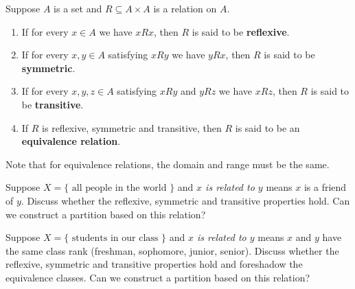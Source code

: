 \begin{dfn}
Suppose $A$ is a set and $R \subseteq A \times A$ is a relation on $A$.
\begin{enumerate}
\item If for every $x \in A$ we have $xRx$, then $R$ is said to be \textbf{reflexive}.
\item If for every $x,y \in A$ satisfying $xRy$ we have $yRx$, then $R$ is said to be \textbf{symmetric}.
\item If for every $x,y,z \in A$ satisfying $xRy$ and $yRz$ we have $xRz$, then $R$ is said to be \textbf{transitive}.
\item If $R$ is reflexive, symmetric and transitive, then $R$ is said to be an \textbf{equivalence relation}.
\end{enumerate}
\end{dfn}

Note that for equivalence relations, the domain and range must be the same.

\begin{expl}
Suppose $X = \{\mbox{ all people in the world }\}$ and \emph{$x$ is related to $y$} means $x$ is a friend of $y$.
Discuss whether the reflexive, symmetric and transitive properties hold.  Can we construct a partition based on this relation?
\end{expl}

\begin{expl}
Suppose $X = \{\mbox{ students in our class }\}$ and \emph{$x$ is related to $y$} means $x$ and $y$ have the same class rank (freshman, sophomore, junior, senior). Discuss whether the reflexive, symmetric and transitive properties hold and foreshadow the equivalence classes.  Can we construct a partition based on this relation?
\begin{annotation}
\end{annotation}
\end{expl}

